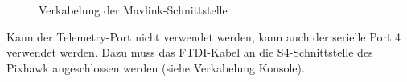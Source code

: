 \documentclass[12pt]{article} %
\begin{document}
	\begin{figure}[H]
		\centering
		\hfill
		\caption{Verkabelung der Mavlink-Schnittstelle}
		\label{2}
	\end{figure}
	
	\noindent
	Kann der Telemetry-Port nicht verwendet werden, kann auch der serielle Port 4 verwendet werden. Dazu muss das FTDI-Kabel an die S4-Schnittstelle des Pixhawk angeschlossen werden (siehe Verkabelung Konsole).
	
\end{document}
